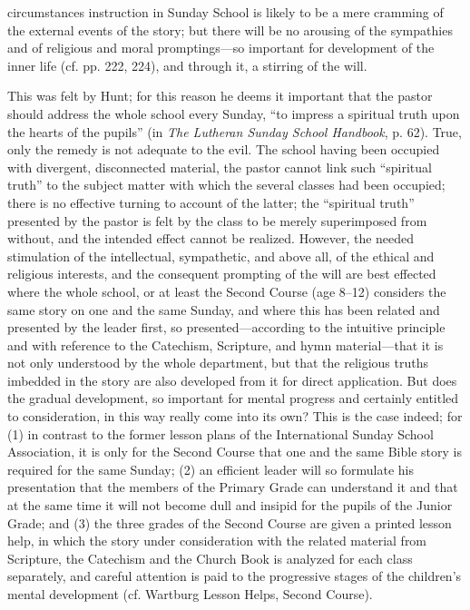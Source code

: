 circumstances instruction in Sunday School is likely to be a mere cramming of the external events of the story; but there will be no arousing of the sympathies and of religious and moral promptings—so important for development of the inner life (cf. pp. 222, 224), and through it, a stirring of the will.

This was felt by Hunt; for this reason he deems it important that the pastor should address the whole school every Sunday, “to impress a spiritual truth upon the hearts of the pupils” (in \emph{The Lutheran Sunday School Handbook}, p. 62). True, only the remedy is not adequate to the evil. The school having been occupied with divergent, disconnected material, the pastor cannot link such “spiritual truth” to the subject matter with which the several classes had been occupied; there is no effective turning to account of the latter; the “spiritual truth” presented by the pastor is felt by the class to be merely superimposed from without, and the intended effect cannot be realized. However, the needed stimulation of the intellectual, sympathetic, and above all, of the ethical and religious interests, and the consequent prompting of the will are best effected where the whole school, or at least the Second Course (age 8–12) considers the same story on one and the same Sunday, and where this has been related and presented by the leader first, so presented—according to the intuitive principle and with reference to the Catechism, Scripture, and hymn material—that it is not only understood by the whole department, but that the religious truths imbedded in the story are also developed from it for direct application. But does the gradual development, so important for mental progress and certainly entitled to consideration, in this way really come into its own? This is the case indeed; for (1) in contrast to the former lesson plans of the International Sunday School Association, it is only for the Second Course that one and the same Bible story is required for the same Sunday; (2) an efficient leader will so formulate his presentation
that the members of the Primary Grade can understand it and that at the same time it will not become dull and insipid for the pupils of the Junior Grade; and (3) the three grades of the Second Course are given a printed lesson help, in which the story under consideration with the related material from Scripture, the Catechism and the Church Book is analyzed for each class separately, and careful attention is paid to the progressive stages of the children’s mental development (cf. Wartburg Lesson Helps, Second Course).

